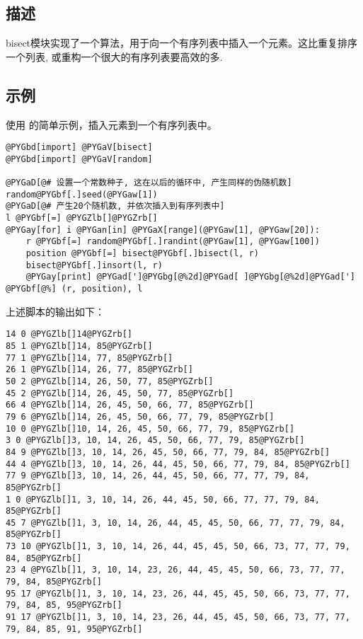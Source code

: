 \documentclass[letterpaper,10pt,english]{manual}
\begin{document}
\subsection{描述}

bisect模块实现了一个算法，用于向一个有序列表中插入一个元素。这比重复排序一个列表, 或重构一个很大的有序列表要高效的多.


\subsection{示例}

使用  的简单示例，插入元素到一个有序列表中。

\begin{Verbatim}[commandchars=@\[\]]
@PYGbd[import] @PYGaV[bisect]
@PYGbd[import] @PYGaV[random]

@PYGaD[@# 设置一个常数种子, 这在以后的循环中, 产生同样的伪随机数]
random@PYGbf[.]seed(@PYGaw[1])
@PYGaD[@# 产生20个随机数, 并依次插入到有序列表中]
l @PYGbf[=] @PYGZlb[]@PYGZrb[]
@PYGay[for] i @PYGan[in] @PYGaX[range](@PYGaw[1], @PYGaw[20]):
    r @PYGbf[=] random@PYGbf[.]randint(@PYGaw[1], @PYGaw[100])
    position @PYGbf[=] bisect@PYGbf[.]bisect(l, r)
    bisect@PYGbf[.]insort(l, r)
    @PYGay[print] @PYGad[']@PYGbg[@%2d]@PYGad[ ]@PYGbg[@%2d]@PYGad['] @PYGbf[@%] (r, position), l
\end{Verbatim}

上述脚本的输出如下：

\begin{Verbatim}[commandchars=@\[\]]
14 0 @PYGZlb[]14@PYGZrb[]
85 1 @PYGZlb[]14, 85@PYGZrb[]
77 1 @PYGZlb[]14, 77, 85@PYGZrb[]
26 1 @PYGZlb[]14, 26, 77, 85@PYGZrb[]
50 2 @PYGZlb[]14, 26, 50, 77, 85@PYGZrb[]
45 2 @PYGZlb[]14, 26, 45, 50, 77, 85@PYGZrb[]
66 4 @PYGZlb[]14, 26, 45, 50, 66, 77, 85@PYGZrb[]
79 6 @PYGZlb[]14, 26, 45, 50, 66, 77, 79, 85@PYGZrb[]
10 0 @PYGZlb[]10, 14, 26, 45, 50, 66, 77, 79, 85@PYGZrb[]
3 0 @PYGZlb[]3, 10, 14, 26, 45, 50, 66, 77, 79, 85@PYGZrb[]
84 9 @PYGZlb[]3, 10, 14, 26, 45, 50, 66, 77, 79, 84, 85@PYGZrb[]
44 4 @PYGZlb[]3, 10, 14, 26, 44, 45, 50, 66, 77, 79, 84, 85@PYGZrb[]
77 9 @PYGZlb[]3, 10, 14, 26, 44, 45, 50, 66, 77, 77, 79, 84, 85@PYGZrb[]
1 0 @PYGZlb[]1, 3, 10, 14, 26, 44, 45, 50, 66, 77, 77, 79, 84, 85@PYGZrb[]
45 7 @PYGZlb[]1, 3, 10, 14, 26, 44, 45, 45, 50, 66, 77, 77, 79, 84, 85@PYGZrb[]
73 10 @PYGZlb[]1, 3, 10, 14, 26, 44, 45, 45, 50, 66, 73, 77, 77, 79, 84, 85@PYGZrb[]
23 4 @PYGZlb[]1, 3, 10, 14, 23, 26, 44, 45, 45, 50, 66, 73, 77, 77, 79, 84, 85@PYGZrb[]
95 17 @PYGZlb[]1, 3, 10, 14, 23, 26, 44, 45, 45, 50, 66, 73, 77, 77, 79, 84, 85, 95@PYGZrb[]
91 17 @PYGZlb[]1, 3, 10, 14, 23, 26, 44, 45, 45, 50, 66, 73, 77, 77, 79, 84, 85, 91, 95@PYGZrb[]
\end{Verbatim}
\end{document}
